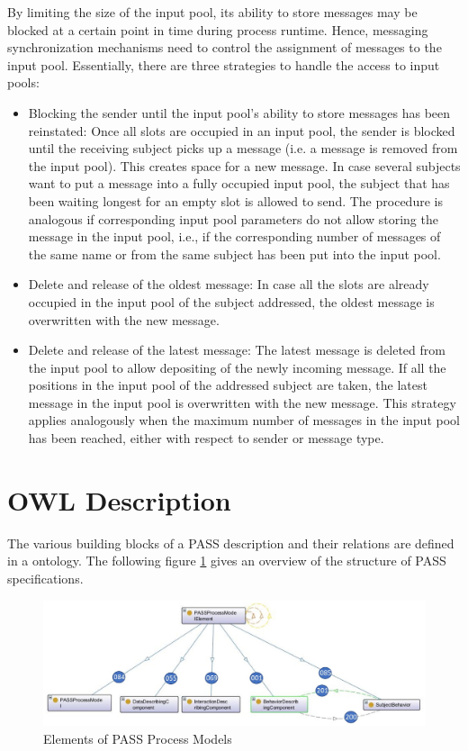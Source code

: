 By limiting the size of the input pool, its ability to store messages may be blocked at a certain point in time during process runtime. Hence, messaging synchronization mechanisms need to control the assignment of messages to the input pool. Essentially, there are three strategies to handle the access to input pools:
\begin{itemize}
	\item Blocking the sender until the input pool’s ability to store messages has been reinstated: Once all slots are occupied in an input pool, the sender is blocked until the receiving subject picks up a message (i.e. a message is removed from the input pool). This creates space for a new message. In case several subjects want to put a message into a fully occupied input pool, the subject that has been waiting longest for an empty slot is allowed to send. The procedure is analogous if corresponding input pool parameters do not allow storing the message in the input pool, i.e., if the corresponding number of messages of the same name or from the same subject has been put into the input pool.
	\item Delete and release of the oldest message: In case all the slots are already occupied in the input pool of the subject addressed, the oldest message is overwritten with the new message.
	\item Delete and release of the latest message: The latest message is deleted from the input pool to allow depositing of the newly incoming message. If all the positions in the input pool of the addressed subject are taken, the latest message in the input pool is overwritten with the new message. This strategy applies analogously when the maximum number of messages in the input pool has been reached, either with respect to sender or message type.
\end{itemize}

\newpage

\section{OWL Description}
\label{OWL-DescriptionSID}

The various building blocks of a PASS description and their relations are defined in a ontology. The following figure \ref{fig:20171217-passprocessmodellelement} gives an overview of the structure of PASS specifications.   

\begin{figure}[ph]
	\centering
	\includegraphics[width=0.9\linewidth]{20181026-Ontologie-Bilder/Grafiken-Ontologie/SUbject-Interaction/20171217-PASSProcessModellElement}
	\caption[Elements of PASS Process Models]{Elements of PASS Process Models}
	\label{fig:20171217-passprocessmodellelement}
\end{figure}

